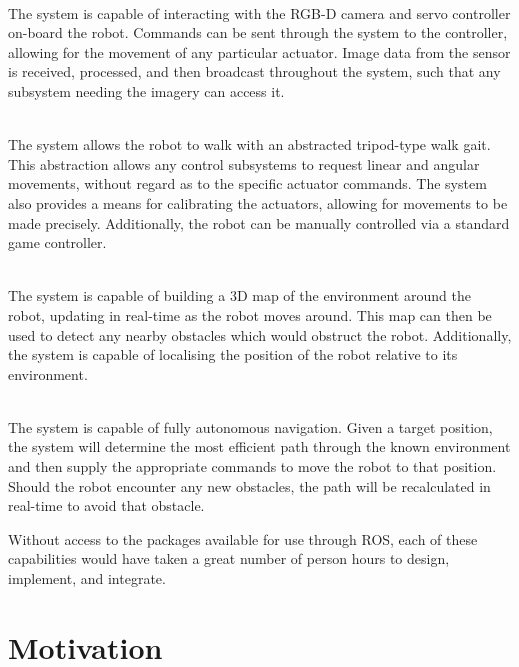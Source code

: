 \begin{description}[labelindent=\parindent]
	\item[Hardware Operations] \hfill \\
	The system is capable of interacting with the RGB-D camera and servo controller on-board the robot. Commands can be sent through the system to the controller, allowing for the movement of any particular actuator. Image data from the sensor is received, processed, and then broadcast throughout the system, such that any subsystem needing the imagery can access it.

	\item[Locomotion] \hfill \\
	The system allows the robot to walk with an abstracted tripod-type walk gait. This abstraction allows any control subsystems to request linear and angular movements, without regard as to the specific actuator commands. The system also provides a means for calibrating the actuators, allowing for movements to be made precisely. Additionally, the robot can be manually controlled via a standard game controller.

	\item[Sensing] \hfill \\
	The system is capable of building a 3D map of the environment around the robot, updating in real-time as the robot moves around. This map can then be used to detect any nearby obstacles which would obstruct the robot. Additionally, the system is capable of localising the position of the robot relative to its environment.

	\item[Navigation] \hfill \\
	The system is capable of fully autonomous navigation. Given a target position, the system will determine the most efficient path through the known environment and then supply the appropriate commands to move the robot to that position. Should the robot encounter any new obstacles, the path will be recalculated in real-time to avoid that obstacle.

\end{description}

Without access to the packages available for use through ROS, each of these capabilities would have taken a great number of person hours to design, implement, and integrate.


\section{Motivation}

